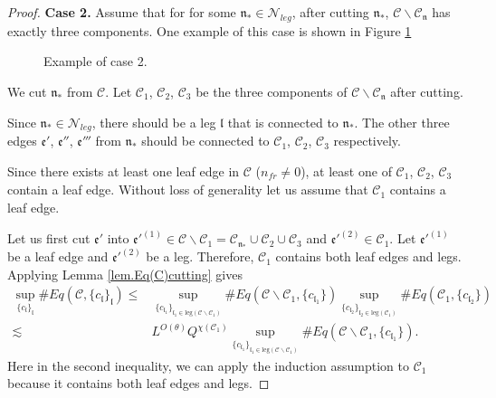 \begin{proof}
\textbf{Case 2.} Assume that for for some $\mathfrak{n}_*\in \mathcal{N}_{leg}$, after cutting $\mathfrak{n}_*$, $\mathcal{C}\backslash \mathcal{C}_{\mathfrak{n}}$ has exactly three components. One example of this case is shown in Figure \ref{fig.examplecase2}
\begin{figure}[H]
        \caption{Example of case 2.}
        \centering
        \label{fig.examplecase2}
    \end{figure}

We cut $\mathfrak{n}_*$ from $\mathcal{C}$. Let $\mathcal{C}_1$, $\mathcal{C}_2$, $\mathcal{C}_3$ be the three components of $\mathcal{C}\backslash \mathcal{C}_{\mathfrak{n}}$ after cutting.

Since $\mathfrak{n}_*\in \mathcal{N}_{leg}$, there should be a leg $\mathfrak{l}$ that is connected to $\mathfrak{n}_*$. The other three edges $\mathfrak{e}'$, $\mathfrak{e}''$, $\mathfrak{e}'''$ from $\mathfrak{n}_*$ should be connected to $\mathcal{C}_1$, $\mathcal{C}_2$, $\mathcal{C}_3$ respectively.  

Since there exists at least one leaf edge in $\mathcal{C}$  ($n_{\textit{fr}}\ne 0$), at least one of $\mathcal{C}_1$, $\mathcal{C}_2$, $\mathcal{C}_3$ contain a leaf edge. Without loss of generality let us assume that $\mathcal{C}_1$ contains a leaf edge.

Let us first cut $\mathfrak{e}'$ into $\mathfrak{e}'^{(1)}\in  \mathcal{C}\backslash\mathcal{C}_1=\mathcal{C}_{\mathfrak{n}_*}\cup \mathcal{C}_2\cup \mathcal{C}_3$ and $\mathfrak{e}'^{(2)}\in  \mathcal{C}_1$. Let $\mathfrak{e}'^{(1)}$ be a leaf edge and $\mathfrak{e}'^{(2)}$ be a leg. Therefore, $\mathcal{C}_1$ contains both leaf edges and legs. Applying Lemma \ref{lem.Eq(C)cutting} gives
\begin{equation}\label{eq.case2expand}
\begin{split}
    \sup_{\{c_{\mathfrak{l}}\}_{\mathfrak{l}}}\#Eq(\mathcal{C},\{c_{\mathfrak{l}}\}_{\mathfrak{l}})\le&
    \sup_{\{c_{\mathfrak{l}_1}\}_{\mathfrak{l}_1\in \text{leg}(\mathcal{C}\backslash\mathcal{C}_1)} } \# Eq(\mathcal{C}\backslash\mathcal{C}_1,\{c_{\mathfrak{l}_1}\}) \sup_{\{c_{\mathfrak{l}_2}\}_{\mathfrak{l}_2\in \text{leg}(\mathcal{C}_1)} }\# Eq(\mathcal{C}_{1}, \{c_{\mathfrak{l}_2}\})
    \\
    \lesssim&  L^{O(\theta)} Q^{\chi(\mathcal{C}_1)}\sup_{\{c_{\mathfrak{l}_1}\}_{\mathfrak{l}_1\in \text{leg}(\mathcal{C}\backslash\mathcal{C}_1)} } \# Eq(\mathcal{C}\backslash\mathcal{C}_1,\{c_{\mathfrak{l}_1}\}).
\end{split}
\end{equation}
Here in the second inequality, we can apply the induction assumption to $\mathcal{C}_1$ because it contains both leaf edges and legs.


\end{proof}
